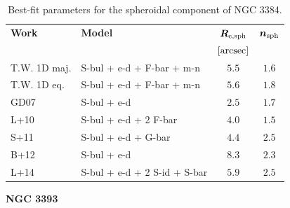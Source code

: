 \documentclass[preprint2]{emulateapj}
\begin{document}
  \begin{table}[h]
  \small
  \caption{Best-fit parameters for the spheroidal component of NGC 3384.}
  \begin{center}
  \begin{tabular}{llcc}
  \hline
  {\bf Work} & {\bf Model}   & $\bm R_{\rm e,sph}$    & $\bm n_{\rm sph}$ \\
    &  &  $[\rm arcsec]$ & \\
  \hline
  T.W. 1D maj. & S-bul + e-d + F-bar + m-n & $5.5$  &  $1.6$ \\
  T.W. 1D eq.  & S-bul + e-d + F-bar + m-n & $5.6$  &  $1.8$ \\
  \hline
  GD07         & S-bul + e-d		      & $2.5$  &  $1.7$ \\
  L+10         & S-bul + e-d + 2 F-bar        & $4.0$  &  $1.5$ \\
  S+11         & S-bul + e-d + G-bar	      & $4.4$  &  $2.5$ \\
  B+12         & S-bul + e-d		      & $8.3$  &  $2.3$ \\
  L+14         & S-bul + e-d + 2 S-id + S-bar & $5.9$  &  $2.5$ \\
  \hline
  \end{tabular}
  \end{center}
  \label{tab:n3384}
  \end{table}

  \clearpage\newpage\noindent
  {\bf NGC 3393 \\}
\end{document}
